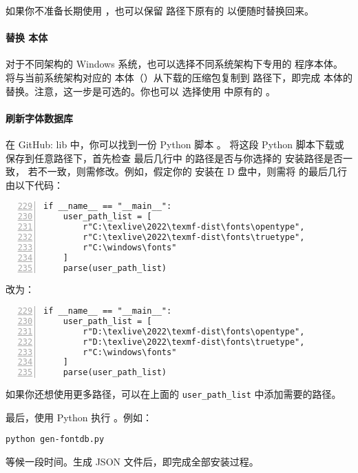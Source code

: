 \documentclass[letterpaper]{article}
\begin{document}
如果你不准备长期使用 \xetexspecimen，也可以保留  路径下原有的 
 以便随时替换回来。

\paragraph{替换 \xetex{} 本体}
对于不同架构的 Windows 系统，也可以选择不同系统架构下专用的 \xetex{} 程序本体。
将与当前系统架构对应的 \xetex{} 本体（）从下载的压缩包复制到 
 路径下，即完成 \xetex{} 本体的替换。注意，这一步是可选的。你也可以
选择使用 \texlive{} 中原有的 。

\paragraph{刷新字体数据库}
在 %
{GitHub: lib} 中，你可以找到一份 Python 脚本 。
将这段 Python 脚本下载或保存到任意路径下，首先检查  
最后几行中 \texlive{} 的路径是否与你选择的 \texlive{} 安装路径是否一致，
若不一致，则需修改。例如，假定你的 \texlive{} 安装在 D 盘中，则需将 
 的最后几行由以下代码：
\begin{Verbatim}[numbers=left,firstnumber=229]
if __name__ == "__main__":
    user_path_list = [
        r"C:\texlive\2022\texmf-dist\fonts\opentype",
        r"C:\texlive\2022\texmf-dist\fonts\truetype",
        r"C:\windows\fonts"
    ]
    parse(user_path_list)
\end{Verbatim}
改为：
\begin{Verbatim}[numbers=left,firstnumber=229]
if __name__ == "__main__":
    user_path_list = [
        r"D:\texlive\2022\texmf-dist\fonts\opentype",
        r"D:\texlive\2022\texmf-dist\fonts\truetype",
        r"C:\windows\fonts"
    ]
    parse(user_path_list)
\end{Verbatim}
如果你还想使用更多路径，可以在上面的 \verb|user_path_list| 中添加需要的路径。

最后，使用 Python 执行 。例如：
\begin{Verbatim}
python gen-fontdb.py
\end{Verbatim}
等候一段时间。生成 JSON 文件后，即完成全部安装过程。
\end{document}
